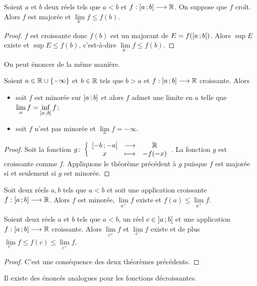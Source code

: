\begin{theo}
  Soient $a$ et $b$ deux réels tels que $a < b$ et $f:\left[ a \, ;  b \right] \longrightarrow \mathbb{R}$. On suppose que $f$ croît. Alors $f$ est majorée et $\lim\limits_{b^{-}}f \leqslant f(b)$.
\end{theo}
\begin{proof}
  $f$ est croissante donc $f(b)$ est un majorant de $E=f(\left[ a \, ;  b \right[)$. Alors $\sup E$ existe et $\sup E \leqslant f(b)$, c'est-à-dire $\lim\limits_{b^{-}}f \leqslant f(b)$.
\end{proof}
On peut énoncer de la même manière.
\begin{theo}
  Soient $a \in \mathbb{R}\cup \{-\infty\}$ et $b \in \mathbb{R}$ tels que $b > a$ et $f:\left] a \, ;  b \right] \longrightarrow \mathbb{R}$ croissante. Alors
  \begin{itemize}
  \item soit $f$ est minorée sur $\left] a \, ;  b \right]$ et alors $f$ admet une limite en $a$ telle que $\lim\limits_{a} f = \inf\limits_{\left] a \, ;  b \right]}f$;
  \item soit $f$ n'est pas minorée et $\lim\limits_{a} f = -\infty$.
  \end{itemize}
\end{theo}
\begin{proof}
  Soit la fonction $g\colon \left\{\begin{array}{ccc} \left[ -b \, ;  -a \right[ & \longrightarrow &\mathbb{R}\\ x & \longmapsto & -f(-x) \end{array} \right.$. La fonction $g$ est croissante comme $f$. Appliquons le théorème précédent à $g$ puisque $f$ est majorée si et seulement si $g$ est minorée.
\end{proof}
\begin{theo}
  Soit deux réels $a,b$ tels que $a < b$ et soit une application croissante $f:\left[ a \, ;  b \right] \longrightarrow \mathbb{R}$. Alors $f$ est minorée, $\lim\limits_{a^{+}} f$ existe et $f(a) \leqslant \lim\limits_{a^{+}} f$.
\end{theo}
\begin{cor}
  Soient deux réels $a$ et $b$ tels que $a < b$, un réel $c \in \left] a \, ;  b \right[$ et une application $f :\left[ a \, ;  b \right] \longrightarrow \mathbb{R}$ croissante. Alors $\lim\limits_{c^{+}} f$ et $\lim\limits_{c^{-}} f$ existe et de plus $\lim\limits_{c^{-}} f \leqslant f(c) \leqslant \lim\limits_{c^{+}} f$.
\end{cor}
\begin{proof}
  C'est une conséquence des deux théorèmes précédents.
\end{proof}

Il existe des énoncés analogues pour les fonctions décroissantes.


